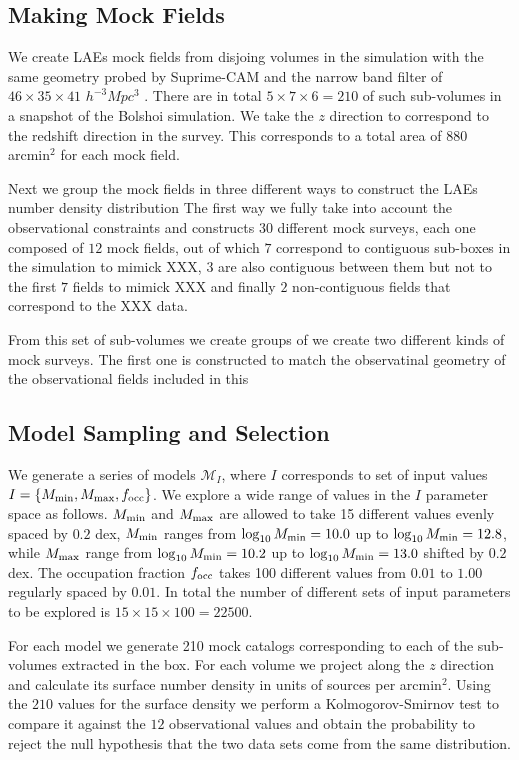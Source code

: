 \documentclass{emulateapj}
\begin{document}
\subsection{Making Mock Fields}


We create LAEs mock fields from disjoing volumes in the simulation with the same geometry probed by Suprime-CAM and the narrow band filter of $46\times 35\times 41$ $h^{-3}Mpc^{3}$ . There are in total $5\times 7 \times 6=210$ of such sub-volumes in a snapshot of the Bolshoi simulation. We take the $z$ direction to correspond to the redshift direction in the survey. This corresponds to a total area of $880$ arcmin$^{2}$ for each mock field.


Next we group the mock fields in three different ways to construct the LAEs number density distribution The first way we fully take into account the observational constraints and constructs $30$ different mock surveys, each one composed of $12$ mock fields, out of which $7$ correspond to contiguous sub-boxes in the simulation to mimick XXX, $3$ are also contiguous between them but not to the first $7$ fields to mimick XXX and finally $2$ non-contiguous fields that correspond to the XXX data.


From this set of sub-volumes we create groups of we create two different kinds of mock surveys. The first one is constructed to match the observatinal geometry of the observational fields included in this 




\subsection{Model Sampling and Selection}
We generate a series of models ${\mathcal M}_{I}$, where $I$ corresponds to set of input values $I=\{M_{\rm min}, M_{\rm max}, f_{\rm occ}\}$. We explore a wide range of values in the $I$ parameter space as follows. $M_{\rm min}$ and $M_{\rm max}$ are allowed to take 15 different values evenly spaced by $0.2$ dex, $M_{\rm min}$ ranges from $\log_{10}M_{\rm min}=10.0$ up to $\log_{10}M_{\rm min}=12.8$, while $M_{\rm max}$ range  from $\log_{10}M_{\rm min}=10.2$ up to $\log_{10}M_{\rm min}=13.0$ shifted by $0.2$ dex. The occupation fraction $f_{\rm occ}$ takes 100 different values from $0.01$ to $1.00$ regularly spaced by $0.01$. In total the number of different sets of input parameters to be explored is $15\times 15\times 100 = 22500$.


For each model we generate 210 mock catalogs corresponding to each of the sub-volumes extracted in the box. For each volume we project along the $z$ direction and calculate its surface number density in units of sources per arcmin$^{2}$. Using the $210$ values for the surface density we perform a Kolmogorov-Smirnov test to compare it against the $12$ observational values and obtain the probability to reject the null hypothesis that the two data sets come from the same distribution. 
\end{document}
